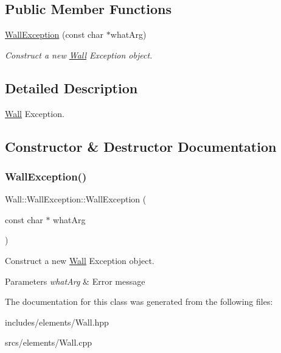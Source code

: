 \subsection*{Public Member Functions}
\begin{DoxyCompactItemize}
\item 
\hyperlink{class_wall_1_1_wall_exception_a210a4779fa0382740225a258b6765953}{Wall\+Exception} (const char $\ast$what\+Arg)
\begin{DoxyCompactList}\small\item\em Construct a new \hyperlink{class_wall}{Wall} Exception object. \end{DoxyCompactList}\end{DoxyCompactItemize}


\subsection{Detailed Description}
\hyperlink{class_wall}{Wall} Exception. 

\subsection{Constructor \& Destructor Documentation}
\mbox{\label{class_wall_1_1_wall_exception_a210a4779fa0382740225a258b6765953}} 
\subsubsection{\texorpdfstring{Wall\+Exception()}{WallException()}}
{\footnotesize\ttfamily Wall\+::\+Wall\+Exception\+::\+Wall\+Exception (\begin{DoxyParamCaption}\item[{const char $\ast$}]{what\+Arg }\end{DoxyParamCaption})\hspace{0.3cm}{\ttfamily [explicit]}}



Construct a new \hyperlink{class_wall}{Wall} Exception object. 


\begin{DoxyParams}{Parameters}
{\em what\+Arg} & Error message \\
\hline
\end{DoxyParams}


The documentation for this class was generated from the following files\+:\begin{DoxyCompactItemize}
\item 
includes/elements/Wall.\+hpp\item 
srcs/elements/Wall.\+cpp\end{DoxyCompactItemize}
